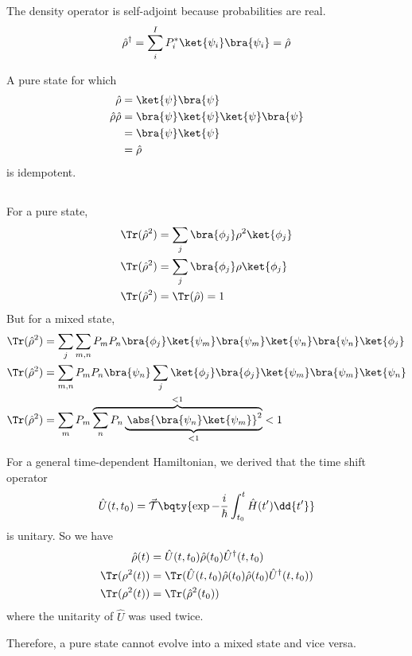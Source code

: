 \documentclass[12pt]{article}
\begin{document}
The density operator is self-adjoint because probabilities are real.
\[
    \hat{\rho}^\dagger  = \sum_{i}^{I}P_i^* \ket{\psi_i} \bra{\psi_i} = \hat{\rho} 
\]

A pure state for which \begin{align*}
    \hat{\rho } &= \ket{\psi}\bra{\psi}\\
    \hat{\rho} \hat{\rho} &= \bra{\psi}\ket{\psi}\ket{\psi}\bra{\psi}\\
    &= \bra{\psi}\ket{\psi}\\
    &= \hat{\rho} 
\end{align*}
is idempotent.
\subsection{} For a pure state,
\begin{align*}
    \Tr(\hat{\rho}^2 ) &=  \sum_j \bra{\phi_j} \rho^2 \ket{\phi_j}\\ 
    \Tr(\hat{\rho}^2 ) &= \sum_j \bra{\phi_j} \rho \ket{\phi_j}\\ 
    \Tr(\hat{\rho}^2 ) &= \Tr(\hat{\rho} ) = 1
\end{align*}
But for a mixed state,
\begin{align*}
    \Tr(\hat{\rho}^2 ) &=\sum_j\sum_{m,n}P_m P_n \bra{\phi_j} \ket{\psi_m} \bra{\psi_m} \ket{\psi_n} \bra{\psi_n}\ket{\phi_j}\\ 
    \Tr(\hat{\rho}^2 ) &=\sum_{m,n}P_m P_n \bra{\psi_n}\sum_j\ket{\phi_j}\bra{\phi_j} \ket{\psi_m} \bra{\psi_m} \ket{\psi_n} \\ 
    \Tr(\hat{\rho}^2 ) &=\sum_{m}P_m \overbrace{\sum_n P_n\underbrace{\, \abs{\bra{\psi_n} \ket{\psi_m} }^2}_{ < 1}}^{ < 1} < 1
\end{align*}

For a general time-dependent Hamiltonian, we derived that the time shift operator\[
    \hat{U}(t, t_0)= \vec{\mathcal{T}}\bqty{\exp{ - \frac{i}{\hbar} \int_{t_0}^t \hat{H}(t')\dd{t'}}}
\]is unitary. So we have \begin{align*}
    \hat{\rho} (t) &=  \hat{U}(t,t_0)\hat{\rho}(t_0)\hat{U}^\dagger(t,t_0)\\
    \Tr(\rho^2(t)) &= \Tr(\hat{U}(t,t_0)\hat{\rho}(t_0)\hat{\rho}(t_0)\hat{U}^\dagger(t,t_0))\\
    \Tr(\rho^2(t)) &= \Tr(\hat{\rho}^2(t_0))
\end{align*}
where the unitarity of \(\hat{U}\) was used twice.

Therefore, a pure state cannot evolve into a mixed state and vice versa.
\end{document}
